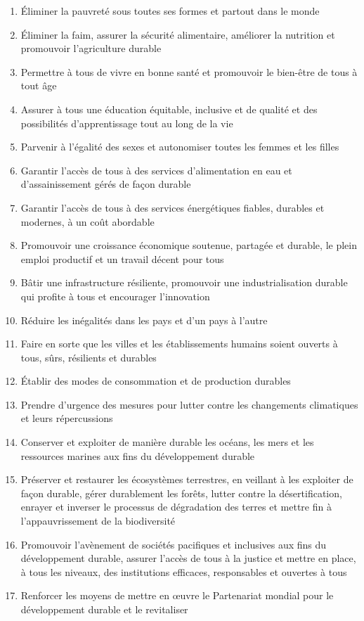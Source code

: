 \documentclass[a4paper,french,12pt]{article}
\begin{document}
\begin{enumerate}
    \item Éliminer la pauvreté sous toutes ses formes et partout dans le monde
    \item Éliminer la faim, assurer la sécurité alimentaire, améliorer la nutrition et promouvoir l’agriculture durable
    \item Permettre à tous de vivre en bonne santé et promouvoir le bien-être de tous à tout âge
    \item Assurer à tous une éducation équitable, inclusive et de qualité et des possibilités d’apprentissage tout au long de la vie
    \item Parvenir à l’égalité des sexes et autonomiser toutes les femmes et les filles
    \item Garantir l’accès de tous à des services d’alimentation en eau et d’assainissement gérés de façon durable
    \item Garantir l’accès de tous à des services énergétiques fiables, durables et modernes, à un coût abordable
    \item Promouvoir une croissance économique soutenue, partagée et durable, le plein emploi productif et un travail décent pour tous
    \item Bâtir une infrastructure résiliente, promouvoir une industrialisation durable qui profite à tous et encourager l’innovation
    \item Réduire les inégalités dans les pays et d’un pays à l’autre
    \item Faire en sorte que les villes et les établissements humains soient ouverts à tous, sûrs, résilients et durables
    \item Établir des modes de consommation et de production durables
    \item Prendre d’urgence des mesures pour lutter contre les changements climatiques et leurs répercussions
    \item Conserver et exploiter de manière durable les océans, les mers et les ressources marines aux fins du développement durable
    \item Préserver et restaurer les écosystèmes terrestres, en veillant à les exploiter de façon durable, gérer durablement les forêts, lutter contre la désertification, enrayer et inverser le processus de dégradation des terres et mettre fin à l’appauvrissement de la biodiversité
    \item Promouvoir l’avènement de sociétés pacifiques et inclusives aux fins du développement durable, assurer l’accès de tous à la justice et mettre en place, à tous les niveaux, des institutions efficaces, responsables et ouvertes à tous
    \item Renforcer les moyens de mettre en œuvre le Partenariat mondial pour le développement durable et le revitaliser
\end{enumerate}
\end{document}
